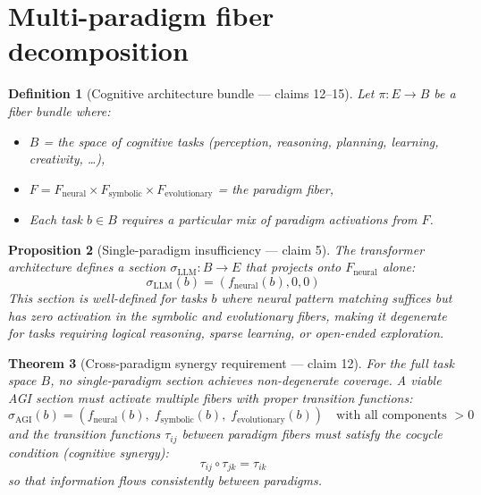 \documentclass[11pt,a4paper]{article}
\newtheorem{definition}{Definition}[section]
\newtheorem{theorem}[definition]{Theorem}
\newtheorem{proposition}[definition]{Proposition}
\begin{document}
\section{Multi-paradigm fiber decomposition}
\label{sec:multi-paradigm}

\begin{definition}[Cognitive architecture bundle --- claims 12--15]
\label{def:cog-bundle}
Let $\pi : E \to B$ be a fiber bundle where:
\begin{itemize}
\item $B$ = the space of cognitive tasks (perception, reasoning,
  planning, learning, creativity, \ldots),
\item $F = F_{\text{neural}} \times F_{\text{symbolic}} \times
  F_{\text{evolutionary}}$ = the paradigm fiber,
\item Each task $b \in B$ requires a particular mix of paradigm
  activations from $F$.
\end{itemize}
\end{definition}

\begin{proposition}[Single-paradigm insufficiency --- claim 5]
\label{prop:single-insufficient}
The transformer architecture defines a section
$\sigma_{\text{LLM}} : B \to E$ that projects onto $F_{\text{neural}}$
alone:
\[
  \sigma_{\text{LLM}}(b) = (f_{\text{neural}}(b), 0, 0)
\]
This section is well-defined for tasks $b$ where neural pattern
matching suffices but has zero activation in the symbolic and
evolutionary fibers, making it degenerate for tasks requiring
logical reasoning, sparse learning, or open-ended exploration.
\end{proposition}

\begin{theorem}[Cross-paradigm synergy requirement --- claim 12]
\label{thm:synergy}
For the full task space $B$, no single-paradigm section achieves
non-degenerate coverage. A viable AGI section must activate multiple
fibers with proper transition functions:
\[
  \sigma_{\text{AGI}}(b) = (f_{\text{neural}}(b),\;
    f_{\text{symbolic}}(b),\; f_{\text{evolutionary}}(b))
  \quad \text{with all components } > 0
\]
and the transition functions $\tau_{ij}$ between paradigm fibers
must satisfy the cocycle condition (cognitive synergy):
\[
  \tau_{ij} \circ \tau_{jk} = \tau_{ik}
\]
so that information flows consistently between paradigms.
\end{theorem}
\end{document}
